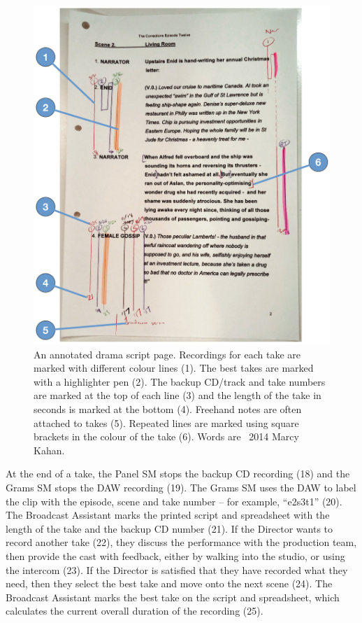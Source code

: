 \begin{figure}
  \centering
  \includegraphics[width=\columnwidth]{figs/drama-markup-labelled.pdf}
  \caption[An annotated drama script page.]{An annotated drama script page. Recordings for each take are marked with
    different colour lines (1). The best takes are marked with a highlighter pen (2). The backup CD/track and take
    numbers are marked at the top of each line (3) and the length of the take in seconds is marked at the bottom (4).
    Freehand notes are often attached to takes (5). Repeated lines are marked using square brackets in the colour of
  the take (6). Words are \textcopyright~2014 Marcy Kahan.}
  \label{fig:drama-script}
\end{figure}

At the end of a take, the Panel SM stops the backup CD recording (18) and the Grams SM stops the DAW recording (19).
The Grams SM uses the DAW to label the clip with the episode, scene and take number -- for example, ``e2s3t1'' (20).
The Broadcast Assistant marks the printed script and spreadsheet with the length of the take and the backup CD number
(21).  If the Director wants to record another take (22), they discuss the performance with the production team, then
provide the cast with feedback, either by walking into the studio, or using the intercom (23).  If the Director is
satisfied that they have recorded what they need, then they select the best take and move onto the next scene (24). The
Broadcast Assistant marks the best take on the script and spreadsheet, which calculates the current overall duration of
the recording (25).

